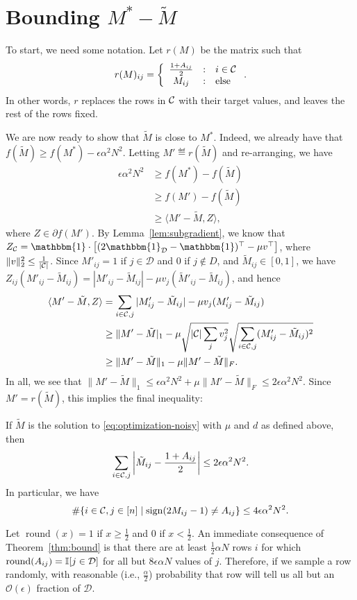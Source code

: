 \documentclass[11pt]{article}
\newcommand{\M}{\tilde{M}}
\newcommand{\sD}{\mathcal{D}}
\newcommand{\oo}{\mathcal{O}}
\newcommand{\bi}{\mathbbm{1}}
\DeclareMathOperator{\round}{round}
\begin{document}
\section{Bounding $M^* - \M$}
To start, we need some notation. Let $r(M)$ be the matrix such that
\[ r(M)_{ij} = \left\{ \begin{array}{ccl} \frac{1+A_{ij}}{2} & : & i \in \mathcal{C} \\ M_{ij} & : & \text{else} \end{array} \right.. \]
In other words, $r$ replaces the rows in $\mathcal{C}$ with their target values, and 
leaves the rest of the rows fixed.



We are now ready to show that $\M$ is close to $M^*$. Indeed, we already 
have that $f(\M) \geq f(M^*) - \epsilon \alpha^2 N^2$. Letting $M' \eqdef r(\M)$ 
and re-arranging, we have
\begin{align}
\epsilon \alpha^2 N^2 &\geq f(M^*) - f(\M) \\
 &\geq f(M') - f(\M) \\
 &\geq \langle M' - \M, Z \rangle,
\end{align}
where $Z \in \partial f(M')$.
By Lemma~\ref{lem:subgradient}, we know that $Z_{\sC} = \bi \cdot \left[(2\bi_{\sD}-\bi)^{\top} - \mu v^{\top}\right]$, 
where $\|v\|_2^2 \leq \frac{1}{|\mathcal{C}|}$. Since $M'_{ij} = 1$ if $j \in \sD$ and $0$ if $j \not\in D$, and 
$\M_{ij} \in [0,1]$, we have $Z_{ij}(M'_{ij}-\M_{ij}) = |M'_{ij} - \M_{ij}| - \mu v_j(\M'_{ij}-\M_{ij})$, and hence
\begin{align}
\langle M' - \M, Z \rangle &= \sum_{i \in \sC, j} |M'_{ij} - \M_{ij}| - \mu v_j (M'_{ij} - \M_{ij}) \\
 &\geq \|M'-\M|_1 - \mu \sqrt{|\sC|\sum_j v_j^2}\sqrt{\sum_{i \in \sC, j} (M_{ij}'-\M_{ij})^2} \\
 &\geq \|M'-\M\|_1 - \mu \|M' - \M\|_F.
\end{align}
In all, we see that $\|M'-\M\|_1 \leq \epsilon \alpha^2 N^2 + \mu \|M' - \M\|_F \leq 2\epsilon \alpha^2 N^2$.
Since $M' = r(\M)$, this implies the final inequality:
\begin{theorem}
\label{thm:bound}
If $\M$ is the solution to \eqref{eq:optimization-noisy} with $\mu$ and $d$ as defined 
above, then
\[ \sum_{i \in \sC, j} \left|\M_{ij} - \frac{1+A_{ij}}{2}\right| \leq 2\epsilon\alpha^2N^2. \]
In particular, we have
\[ \#\{i \in \mathcal{C}, j \in [n] \mid \operatorname{sign}(2M_{ij}-1) \neq A_{ij}\} \leq 4\epsilon\alpha^2N^2. \]
\end{theorem}
Let $\round(x) = 1$ if $x \geq \frac{1}{2}$ and $0$ if $x < \frac{1}{2}$. An immediate consequence 
of Theorem~\ref{thm:bound} is that 
there are at least $\frac{1}{2}\alpha N$ rows $i$ for which $\round(A_{ij}) = \bI[j \in \sD]$ 
for all but $8\epsilon \alpha N$ values of $j$. Therefore, if we sample a row randomly, with 
reasonable (i.e., $\frac{\alpha}{2}$) probability that row will tell us all but an $\oo(\epsilon)$ fraction of $\sD$.
\end{document}
